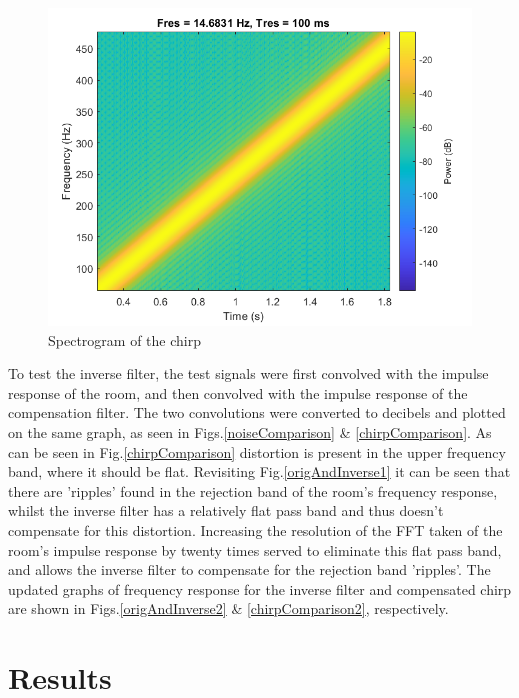 \documentclass[conference]{IEEEtran}
\begin{document}
        \begin{figure}[H]
            \centering
            \includegraphics[scale = 0.45]{resources/spectrogram.png}
            \caption{Spectrogram of the chirp}
            \label{spectrogram}
        \end{figure}
        To test the inverse filter, the test signals were first convolved with the impulse response of the room, and then convolved with the impulse response of the compensation filter.
        The two convolutions were converted to decibels and plotted on the same graph, as seen in Figs.\ref{noiseComparison} \& \ref{chirpComparison}.
        As can be seen in Fig.\ref{chirpComparison} distortion is present in the upper frequency band, where it should be flat.
        Revisiting Fig.\ref{origAndInverse1} it can be seen that there are 'ripples' found in the rejection band of the room's frequency response, whilst the inverse filter has a relatively flat pass band and thus doesn't compensate for this distortion.
        Increasing the resolution of the FFT taken of the room's impulse response by twenty times served to eliminate this flat pass band, and allows the inverse filter to compensate for the rejection band 'ripples'.
        The updated graphs of frequency response for the inverse filter and compensated chirp are shown in Figs.\ref{origAndInverse2} \& \ref{chirpComparison2}, respectively.
\section{Results}
\end{document}
